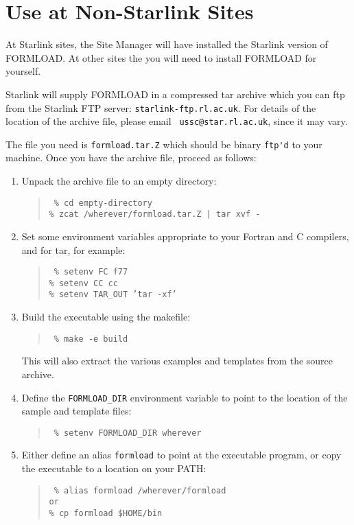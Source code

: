 \section{Use at Non-Starlink Sites}

At Starlink sites, the Site Manager will have installed the Starlink
version of FORMLOAD.  At other sites the you will need to install
FORMLOAD for yourself.

Starlink will supply FORMLOAD in a compressed tar archive which you can
ftp from the Starlink FTP server: {\tt starlink-ftp.rl.ac.uk}. For
details of the location of the archive file, please email {\tt
ussc@star.rl.ac.uk}, since it may vary.

The file you need is \verb|formload.tar.Z| which should be binary
\verb|ftp'd| to your machine.  Once you have the archive file, proceed as
follows:

\begin{enumerate}

\item  Unpack the archive file to an empty directory:
\begin{quote}\tt
\% cd empty-directory\\
\% zcat /wherever/formload.tar.Z | tar xvf -
\end{quote}

\item  Set some environment variables appropriate to your Fortran and C
compilers, and for tar, for example:

\begin{quote}\tt
\% setenv FC f77 \\
\% setenv CC cc \\
\% setenv TAR\_OUT 'tar -xf'
\end{quote}

\item  Build the executable using the makefile:
\begin{quote}\tt
\% make -e build
\end{quote}
This will also extract the various examples and templates from the source
archive.

\item  Define the {\tt FORMLOAD\_DIR} environment variable to point to the
location of the sample and template files:
\begin{quote}\tt
\% setenv FORMLOAD\_DIR wherever
\end{quote}

\item  Either define an alias \verb|formload| to point at the executable
program, or copy the executable to a location on your PATH:
\begin{quote}\tt
\% alias formload /wherever/formload \\
{\rm or} \\
\% cp formload \$HOME/bin
\end{quote}

\end{enumerate}

